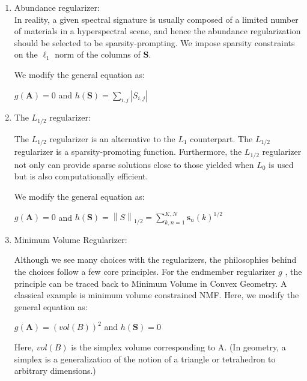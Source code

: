 \documentclass[fleqn, 11pt]{article}
\newcommand{\bs}[1]{\boldsymbol{#1}}
\newcommand\norm[1]{\left\lVert#1\right\rVert}
\begin{document}
\begin{enumerate}
    \item Abundance regularizer: \\ In reality, a given
spectral signature is usually composed of a limited number of
materials in a hyperspectral scene, and hence the abundance
regularization should be selected to be sparsity-prompting. We impose sparsity constraints on the $\ell_1$ norm of the columns of $\bs{S}$. 

We modify the general equation as: 

$g(\bs{A})=0$ and 
$h(\bs{S}) = \displaystyle \sum_{i,j} | S_{i,j} | $

\item The $L_{1/2}$ regularizer: 

 The $L_{1/2}$ regularizer is an
alternative to the $L_{1}$ counterpart. The $L_{1/2}$
regularizer is a sparsity-promoting function. Furthermore,
the $L_{1/2}$ regularizer not only can provide sparse solutions close
to those yielded when $L_{0}$ is used but is also computationally
efficient.

We modify the general equation as: 

$g(\bs{A})=0$ and 
$h(\bs{S}) = \norm{S}_{1/2} = 
\displaystyle \sum_{k,n=1}^{K,N} \bs{s}_n(k)^{1/2}
$

\item Minimum Volume Regularizer: 

Although we see many choices with the regularizers, the philosophies 
behind the choices follow a few core principles. For the endmember regularizer $g$ , the principle can be
traced back to Minimum Volume in Convex Geometry. A classical example is minimum
volume constrained NMF. Here, we modify the general equation as: 


$g(\bs{A})= (vol(B))^2
$ and 
$h(\bs{S}) = 0$

Here, $vol(B)$ is the simplex volume corresponding to A. (In geometry, a simplex is a generalization of the notion of a triangle or tetrahedron to arbitrary dimensions.)


\end{enumerate}
\end{document}

